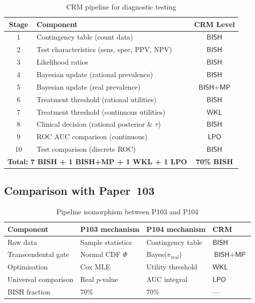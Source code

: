 \documentclass[11pt,a4paper]{article}
\theoremstyle{plain}
\theoremstyle{definition}
\newcommand{\BISH}{\textsf{BISH}}
\newcommand{\WKL}{\textsf{WKL}}
\newcommand{\LPO}{\textsf{LPO}}
\newcommand{\MP}{\textsf{MP}}
\begin{document}
\begin{table}[ht]
\centering
\caption{CRM pipeline for diagnostic testing}
\label{tab:pipeline}
\begin{tabular}{clc}
\toprule
Stage & Component & CRM Level \\
\midrule
1 & Contingency table (count data) & $\BISH$ \\
2 & Test characteristics (sens, spec, PPV, NPV) & $\BISH$ \\
3 & Likelihood ratios & $\BISH$ \\
4 & Bayesian update (rational prevalence) & $\BISH$ \\
5 & Bayesian update (real prevalence) & $\BISH + \MP$ \\
6 & Treatment threshold (rational utilities) & $\BISH$ \\
7 & Treatment threshold (continuous utilities) & $\WKL$ \\
8 & Clinical decision (rational posterior \& $\tau$) & $\BISH$ \\
9 & ROC AUC comparison (continuous) & $\LPO$ \\
10 & Test comparison (discrete ROC) & $\BISH$ \\
\midrule
\multicolumn{2}{l}{\textbf{Total: 7 BISH + 1 BISH+MP + 1 WKL + 1 LPO}} & \textbf{70\% BISH} \\
\bottomrule
\end{tabular}
\end{table}

\subsection{Comparison with Paper~103}

\begin{table}[ht]
\centering
\caption{Pipeline isomorphism between P103 and P104}
\label{tab:comparison}
\begin{tabular}{llll}
\toprule
Component & P103 mechanism & P104 mechanism & CRM \\
\midrule
Raw data & Sample statistics & Contingency table & $\BISH$ \\
Transcendental gate & Normal CDF $\Phi$ & Bayes($\pi_{\mathrm{real}}$) & $\BISH + \MP$ \\
Optimisation & Cox MLE & Utility threshold & $\WKL$ \\
Universal comparison & Real $p$-value & AUC integral & $\LPO$ \\
BISH fraction & 70\% & 70\% & --- \\
\bottomrule
\end{tabular}
\end{table}
\end{document}
